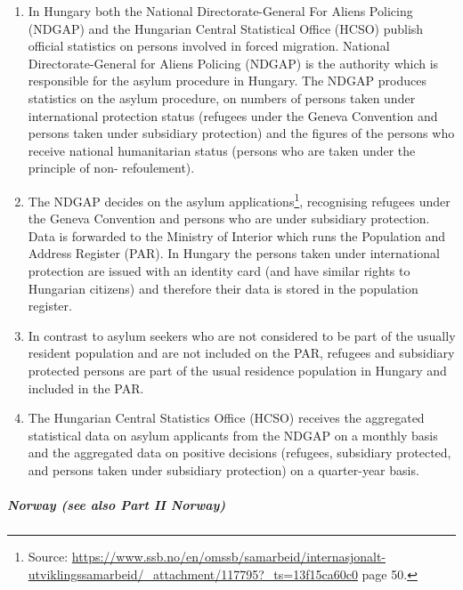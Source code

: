 \documentclass[
]{article}
\begin{document}
\begin{enumerate}
\def\labelenumi{\arabic{enumi}.}
\setcounter{enumi}{158}
\item
  In Hungary both the National Directorate-General For Aliens
  Policing (NDGAP) and the Hungarian Central Statistical Office (HCSO)
  publish official statistics on persons involved in forced migration.
  National Directorate-General for Aliens Policing (NDGAP) is the
  authority which is responsible for the asylum procedure in Hungary.
  The NDGAP produces statistics on the asylum procedure, on numbers of
  persons taken under international protection status (refugees under
  the Geneva Convention and persons taken under subsidiary protection)
  and the figures of the persons who receive national humanitarian
  status (persons who are taken under the principle of non-
  refoulement).
\item
  The NDGAP decides on the asylum applications\footnote{Source:
    \url{https://www.ssb.no/en/omssb/samarbeid/internasjonalt-utviklingssamarbeid/_attachment/117795?_ts=13f15ca60c0}
    page 50.}, recognising
  refugees under the Geneva Convention and persons who are under
  subsidiary protection. Data is forwarded to the Ministry of Interior
  which runs the Population and Address Register (PAR). In Hungary the
  persons taken under international protection are issued with an
  identity card (and have similar rights to Hungarian citizens) and
  therefore their data is stored in the population register.
\item
  In contrast to asylum seekers who are not considered to be part of
  the usually resident population and are not included on the PAR,
  refugees and subsidiary protected persons are part of the usual
  residence population in Hungary and included in the PAR.
\item
  The Hungarian Central Statistics Office (HCSO) receives the
  aggregated statistical data on asylum applicants from the NDGAP on a
  monthly basis and the aggregated data on positive decisions
  (refugees, subsidiary protected, and persons taken under subsidiary
  protection) on a quarter-year basis.
\end{enumerate}

\hypertarget{norway-see-also-part-ii-norway}{%
\subparagraph{Norway (see also Part II Norway)}\label{norway-see-also-part-ii-norway}}
\end{document}

